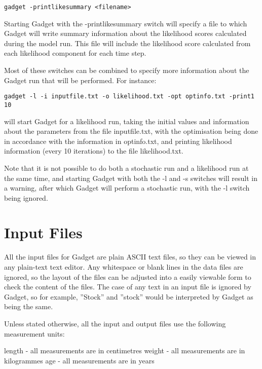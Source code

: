 \documentclass [a4paper, 10pt]{book}
\begin{document}
{\small\begin{verbatim}
gadget -printlikesummary <filename>
\end{verbatim}}
Starting Gadget with the -printlikesummary switch will specify a file to which Gadget will write summary information about the likelihood scores calculated during the model run.  This file will include the likelihood score calculated from each likelihood component for each time step.

\bigskip
Most of these switches can be combined to specify more information about the Gadget run that will be performed.  For instance:

{\small\begin{verbatim}
gadget -l -i inputfile.txt -o likelihood.txt -opt optinfo.txt -print1 10
\end{verbatim}}

will start Gadget for a likelihood run, taking the initial values and information about the parameters from the file inputfile.txt, with the optimisation being done in accordance with the information in optinfo.txt, and printing likelihood information (every 10 iterations) to the file likelihood.txt.

\bigskip
Note that it is not possible to do both a stochastic run and a likelihood run at the same time, and starting Gadget with both the -l and -s switches will result in a warning, after which Gadget will perform a stochastic run, with the -l switch being ignored.

\chapter{Input Files}\label{chap:input}
All the input files for Gadget are plain ASCII text files, so they can be viewed in any plain-text text editor.  Any whitespace or blank lines in the data files are ignored, so the layout of the files can be adjusted into a easily viewable form to check the content of the files.  The case of any text in an input file is ignored by Gadget, so for example, ''Stock'' and ''stock'' would be interpreted by Gadget as being the same.

\bigskip
Unless stated otherwise, all the input and output files use the following measurement units:\newline

length - all measurements are in centimetres\newline
weight - all measurements are in kilogrammes\newline
age - all measurements are in years
\end{document}
